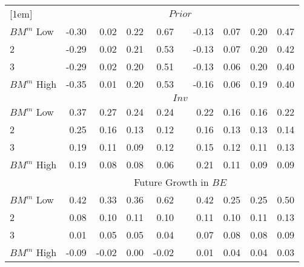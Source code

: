 \begin{table}[!ht]
\begin{tabular}{lrrrrcrrrr}
[1em]
                          & \multicolumn{9}{c}{$Prior$} \\
  $BM^m$ Low              & -0.30 &  0.02 &  0.22 &  0.67 & & -0.13 &  0.07 &  0.20 &  0.47 \\
  2                       & -0.29 &  0.02 &  0.21 &  0.53 & & -0.13 &  0.07 &  0.20 &  0.42 \\
  3                       & -0.29 &  0.02 &  0.20 &  0.51 & & -0.13 &  0.06 &  0.20 &  0.40 \\
  $BM^m$ High             & -0.35 &  0.01 &  0.20 &  0.53 & & -0.16 &  0.06 &  0.19 &  0.40 \\
[1em]
                          & \multicolumn{9}{c}{$Inv$} \\
  $BM^m$ Low              &  0.37 &  0.27 &  0.24 &  0.24 & &  0.22 &  0.16 &  0.16 &  0.22 \\
  2                       &  0.25 &  0.16 &  0.13 &  0.12 & &  0.16 &  0.13 &  0.13 &  0.14 \\
  3                       &  0.19 &  0.11 &  0.09 &  0.12 & &  0.15 &  0.12 &  0.11 &  0.13 \\
  $BM^m$ High             &  0.19 &  0.08 &  0.08 &  0.06 & &  0.21 &  0.11 &  0.09 &  0.09 \\
[1em]
                          & \multicolumn{9}{c}{Future Growth in $BE$} \\
  $BM^m$ Low              &  0.42 &  0.33 &  0.36 &  0.62 & &  0.42 &  0.25 &  0.25 &  0.50 \\
  2                       &  0.08 &  0.10 &  0.11 &  0.10 & &  0.11 &  0.10 &  0.11 &  0.13 \\
  3                       &  0.01 &  0.05 &  0.05 &  0.04 & &  0.07 &  0.08 &  0.08 &  0.09 \\
  $BM^m$ High             & -0.09 & -0.02 &  0.00 & -0.02 & &  0.01 &  0.04 &  0.04 &  0.03 \\
[1em]
  \bottomrule
\end{tabular}
\label{tbl:BMm_Prior_future_BE}
\end{table}
